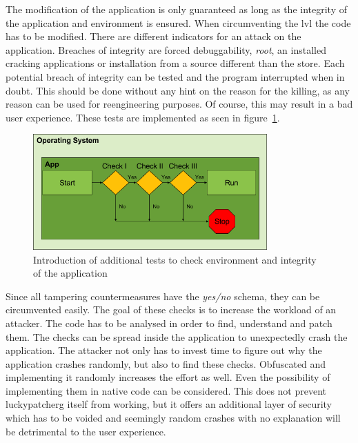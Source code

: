 The modification of the application is only guaranteed as long as the integrity of the application and environment is ensured.
\newline
When circumventing the \gls{lvl} the code has to be modified.
There are different indicators for an attack on the application.
Breaches of integrity are forced debuggability, \textit{root}, an installed cracking applications or installation from a source different than the store.
\newline
Each potential breach of integrity can be tested and the program interrupted when in doubt.
This should be done without any hint on the reason for the killing, as any reason can be used for reengineering purposes.
Of course, this may result in a bad user experience.
These tests are implemented as seen in figure~\ref{fig:verificationNowAdditional}.
\begin{figure}[h]
    \centering
    \includegraphics[width=0.8\textwidth]{data/verificationNowAdditional.png}
    \caption{Introduction of additional tests to check environment and integrity of the application}
    \label{fig:verificationNowAdditional}
\end{figure}
Since all tampering countermeasures have the \textit{yes/no} schema, they can be circumvented easily.
The goal of these checks is to increase the workload of an attacker.
The code has to be analysed in order to find, understand and patch them.
The checks can be spread inside the application to unexpectedly crash the application.
The attacker not only has to invest time to figure out why the application crashes randomly, but also to find these checks.
Obfuscated and implementing it randomly increases the effort as well.
Even the possibility of implementing them in native code can be considered.
\newline
This does not prevent \gls{luckypatcherg} itself from working, but it offers an additional layer of security which has to be voided and seemingly random crashes with no explanation will be detrimental to the user experience.
